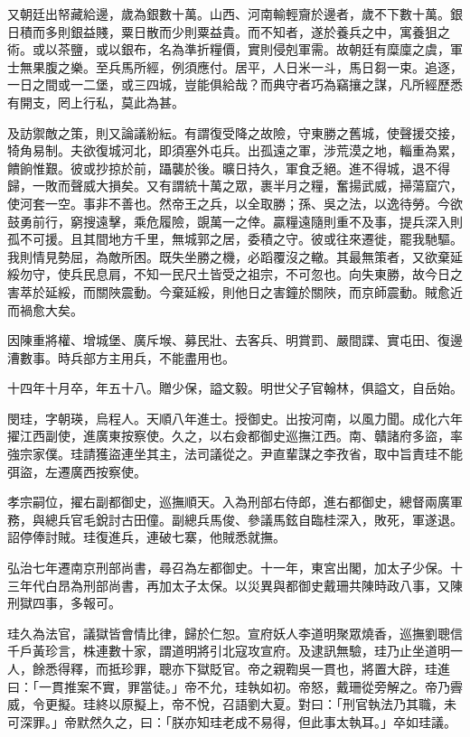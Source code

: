 \begin{pinyinscope}
又朝廷出帑藏給邊，歲為銀數十萬。山西、河南輸輕齎於邊者，歲不下數十萬。銀日積而多則銀益賤，粟日散而少則粟益貴。而不知者，遂於養兵之中，寓養狙之術。或以茶鹽，或以銀布，名為準折糧價，實則侵剋軍需。故朝廷有糜廩之虞，軍士無果腹之樂。至兵馬所經，例須應付。居平，人日米一斗，馬日芻一束。追逐，一日之間或一二堡，或三四城，豈能俱給哉？而典守者巧為竊攘之謀，凡所經歷悉有開支，罔上行私，莫此為甚。

及訪禦敵之策，則又論議紛紜。有謂復受降之故險，守東勝之舊城，使聲援交接，犄角易制。夫欲復城河北，即須塞外屯兵。出孤遠之軍，涉荒漠之地，輜重為累，饋餉惟艱。彼或抄掠於前，躡襲於後。曠日持久，軍食乏絕。進不得城，退不得歸，一敗而聲威大損矣。又有謂統十萬之眾，裹半月之糧，奮揚武威，掃蕩窟穴，使河套一空。事非不善也。然帝王之兵，以全取勝；孫、吳之法，以逸待勞。今欲鼓勇前行，窮搜遠擊，乘危履險，覬萬一之倖。贏糧遠隨則重不及事，提兵深入則孤不可援。且其間地方千里，無城郭之居，委積之守。彼或往來遷徙，罷我馳驅。我則情見勢屈，為敵所困。既失坐勝之機，必蹈覆沒之轍。其最無策者，又欲棄延綏勿守，使兵民息肩，不知一民尺土皆受之祖宗，不可忽也。向失東勝，故今日之害萃於延綏，而關陜震動。今棄延綏，則他日之害鐘於關陜，而京師震動。賊愈近而禍愈大矣。

因陳重將權、增城堡、廣斥堠、募民壯、去客兵、明賞罰、嚴間諜、實屯田、復邊漕數事。時兵部方主用兵，不能盡用也。

十四年十月卒，年五十八。贈少保，謚文毅。明世父子官翰林，俱謚文，自岳始。

閔珪，字朝瑛，烏程人。天順八年進士。授御史。出按河南，以風力聞。成化六年擢江西副使，進廣東按察使。久之，以右僉都御史巡撫江西。南、贛諸府多盜，率強宗家僕。珪請獲盜連坐其主，法司議從之。尹直輩謀之李孜省，取中旨責珪不能弭盜，左遷廣西按察使。

孝宗嗣位，擢右副都御史，巡撫順天。入為刑部右侍郎，進右都御史，總督兩廣軍務，與總兵官毛銳討古田僮。副總兵馬俊、參議馬鉉自臨桂深入，敗死，軍遂退。詔停俸討賊。珪復進兵，連破七寨，他賊悉就撫。

弘治七年遷南京刑部尚書，尋召為左都御史。十一年，東宮出閣，加太子少保。十三年代白昂為刑部尚書，再加太子太保。以災異與都御史戴珊共陳時政八事，又陳刑獄四事，多報可。

珪久為法官，議獄皆會情比律，歸於仁恕。宣府妖人李道明聚眾燒香，巡撫劉聰信千戶黃珍言，株連數十家，謂道明將引北寇攻宣府。及逮訊無驗，珪乃止坐道明一人，餘悉得釋，而抵珍罪，聰亦下獄貶官。帝之親鞫吳一貫也，將置大辟，珪進曰：「一貫推案不實，罪當徒。」帝不允，珪執如初。帝怒，戴珊從旁解之。帝乃霽威，令更擬。珪終以原擬上，帝不悅，召語劉大夏。對曰：「刑官執法乃其職，未可深罪。」帝默然久之，曰：「朕亦知珪老成不易得，但此事太執耳。」卒如珪議。


\end{pinyinscope}
